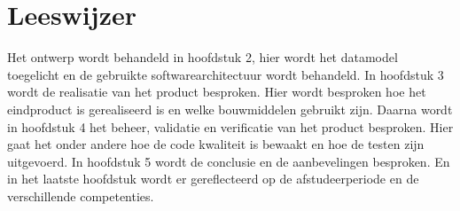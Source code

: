 \section{Leeswijzer}
Het ontwerp wordt behandeld in hoofdstuk 2, hier wordt het datamodel toegelicht en de gebruikte softwarearchitectuur wordt behandeld.
In hoofdstuk 3 wordt de realisatie van het product besproken.
Hier wordt besproken hoe het eindproduct is gerealiseerd is en welke bouwmiddelen gebruikt zijn.
Daarna wordt in hoofdstuk 4 het beheer, validatie en verificatie van het product besproken.
Hier gaat het onder andere hoe de code kwaliteit is bewaakt en hoe de testen zijn uitgevoerd.
In hoofdstuk 5 wordt de conclusie en de aanbevelingen besproken.
En in het laatste hoofdstuk wordt er gereflecteerd op de afstudeerperiode en de verschillende competenties.
